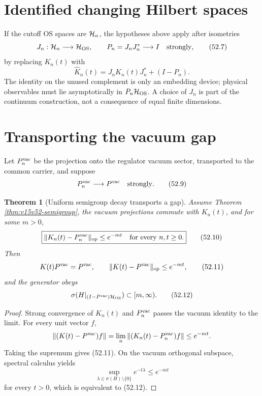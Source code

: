\documentclass[11pt]{article}
\newtheorem{theorem}{Theorem}[section]
\theoremstyle{remark}
\begin{document}
\section{Identified changing Hilbert spaces}

If the cutoff OS spaces are \({\cal H}_n\), the hypotheses above
apply after isometries
\[
 J_n:{\cal H}_n\longrightarrow{\cal H}_{\rm OS},\qquad
 P_n=J_nJ_n^*\longrightarrow I\quad\text{strongly},     \tag{52.7}
\]
by replacing \(K_n(t)\) with
\[
 \widehat K_n(t)=J_nK_n(t)J_n^*+(I-P_n).                \tag{52.8}
\]
The identity on the unused complement is only an embedding device;
physical observables must lie asymptotically in \(P_n{\cal H}_{\rm
OS}\).  A choice of \(J_n\) is part of the continuum construction,
not a consequence of equal finite dimensions.

\section{Transporting the vacuum gap}

Let \(P_n^{\rm vac}\) be the projection onto the regulator vacuum
sector, transported to the common carrier, and suppose
\[
 P_n^{\rm vac}\longrightarrow P^{\rm vac}
 \quad\text{strongly}.                                  \tag{52.9}
\]

\begin{theorem}[Uniform semigroup decay transports a gap]
\label{thm:v15v52-gap}
Assume Theorem \ref{thm:v15v52-semigroup}, the vacuum projections
commute with \(K_n(t)\), and for some \(m>0\),
\[
 \boxed{
 \|K_n(t)-P_n^{\rm vac}\|_{\rm op}\leq e^{-mt}
 \quad\text{for every \(n,t\geq0\)}.}                   \tag{52.10}
\]
Then
\[
 K(t)P^{\rm vac}=P^{\rm vac},\qquad
 \|K(t)-P^{\rm vac}\|_{\rm op}\leq e^{-mt},             \tag{52.11}
\]
and the generator obeys
\[
 \sigma(H|_{(I-P^{\rm vac}){\cal H}_{\rm OS}})
 \subset[m,\infty).                                     \tag{52.12}
\]
\end{theorem}

\begin{proof}
Strong convergence of \(K_n(t)\) and \(P_n^{\rm vac}\) passes the
vacuum identity to the limit.  For every unit vector \(f\),
\[
 \|(K(t)-P^{\rm vac})f\|
 =\lim_n\|(K_n(t)-P_n^{\rm vac})f\|
 \leq e^{-mt}.
\]
Taking the supremum gives (52.11).  On the vacuum orthogonal
subspace, spectral calculus yields
\[
 \sup_{\lambda\in\sigma(H)\setminus\{0\}}e^{-t\lambda}
 \leq e^{-mt}
\]
for every \(t>0\), which is equivalent to (52.12).
\end{proof}
\end{document}
